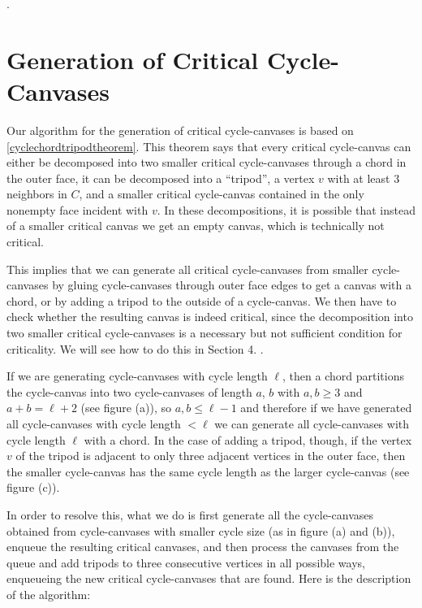 .

\section{Generation of Critical Cycle-Canvases}

Our algorithm for the generation of critical cycle-canvases is based on \ref{cyclechordtripodtheorem}. 
This theorem says that every critical cycle-canvas can either be decomposed into two smaller critical 
cycle-canvases through a chord in the outer face, it can be decomposed into a ``tripod'', a vertex $v$ 
with at least $3$ neighbors in $C$, and a smaller critical cycle-canvas contained in the only nonempty 
face incident with $v$. In these decompositions, it is possible that instead of a smaller critical canvas 
we get an empty canvas, which is technically not critical. 

This implies that we can generate all critical cycle-canvases from smaller cycle-canvases by gluing
cycle-canvases through outer face edges to get a canvas with a chord, or by adding a tripod to the
outside of a cycle-canvas. We then have to check whether the resulting canvas is indeed critical,
since the decomposition into two smaller critical cycle-canvases is a necessary but not sufficient condition
for criticality. We will see how to do this in Section 4. .



If we are generating cycle-canvases with cycle length $\ell$, then a chord partitions
the cycle-canvas into two cycle-canvases of length $a$, $b$ with $a, b \geq 3$ and $a + b = \ell + 2$ (see figure (a)), so 
$a, b \leq \ell-1$ and therefore if we have generated all cycle-canvases with cycle length $< \ell$ we can generate
all cycle-canvases with cycle length $\ell$ with a chord. In the case of adding a tripod, though, if the vertex $v$ of
the tripod is adjacent to only three adjacent vertices in the outer face, then the smaller cycle-canvas has the same
cycle length as the larger cycle-canvas (see figure (c)).

In order to resolve this, what we do is first generate all the cycle-canvases obtained from cycle-canvases with smaller cycle size 
(as in figure (a) and (b)), enqueue the resulting critical canvases, and then process the canvases from the queue and add tripods 
to three consecutive vertices in all possible ways, enqueueing the new critical cycle-canvases that are found. Here is the description 
of the algorithm:

